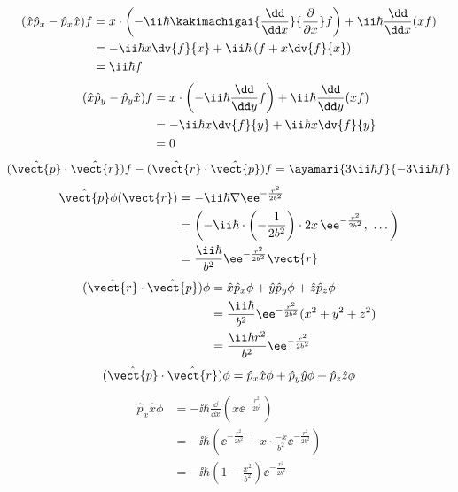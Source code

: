 \begin{align*}
(\hat{x}\hat{p}_{x}-\hat{p}_{x}\hat{x})f&=x\cdot\left(-\ii\hbar\kakimachigai{\frac{\dd}{\dd x}}{\frac{\partial}{\partial x}}f\right)+\ii\hbar\frac{\dd}{\dd x}(xf)\\
&=-\ii\hbar x\dv{f}{x}+\ii\hbar\left(f+x\dv{f}{x}\right)\\
&=\ii\hbar f
\end{align*}
\begin{align*}
(\hat{x}\hat{p}_{y}-\hat{p}_{y}\hat{x})f&=x\cdot\left(-\ii\hbar\frac{\dd}{\dd y}f\right)+\ii\hbar\frac{\dd}{\dd y}(xf)\\
&=-\ii\hbar x\dv{f}{y}+\ii\hbar x\dv{f}{y}\\
&=0
\end{align*}
\[ (\hat{\vect{p}}\cdot\hat{\vect{r}})f-(\hat{\vect{r}}\cdot\hat{\vect{p}})f=\ayamari{3\ii\hbar f}{-3\ii\hbar f} \]
\begin{align*}
\hat{\vect{p}}\phi(\vect{r})&=-\ii\hbar\nabla\ee^{-\frac{r^{2}}{2b^{2}}}\\
&=\left(-\ii\hbar\cdot\left(-\frac{1}{2b^{2}}\right)\cdot2x\,\ee^{-\frac{r^{2}}{2b^{2}}},\ \dots\right)\\
&=\frac{\ii\hbar}{b^{2}}\ee^{-\frac{r^{2}}{2b^{2}}}\vect{r}
\end{align*}
\begin{align*}
(\hat{\vect{r}}\cdot\hat{\vect{p}})\phi&=\hat{x}\hat{p}_{x}\phi+\hat{y}\hat{p}_{y}\phi+\hat{z}\hat{p}_{z}\phi\\
&=\frac{\ii\hbar}{b^{2}}\ee^{-\frac{r^{2}}{2b^{2}}}(x^{2}+y^{2}+z^{2})\\
&=\frac{\ii\hbar r^{2}}{b^{2}}\ee^{-\frac{r^{2}}{2b^{2}}}
\end{align*}
\[ (\hat{\vect{p}}\cdot\hat{\vect{r}})\phi=\hat{p}_{x}\hat{x}\phi+\hat{p}_{y}\hat{y}\phi+\hat{p}_{z}\hat{z}\phi \]
\begin{align*}
\hat{p}_{x}\hat{x}\phi&=-\ii\hbar\frac{\dd}{\dd x}\left(x\ee^{-\frac{r^{2}}{2b^{2}}}\right)\\
&=-\ii\hbar\left(\ee^{-\frac{r^{2}}{2b^{2}}}+x\cdot\frac{-x}{b^{2}}\ee^{-\frac{r^{2}}{2b^{2}}}\right)\\
&=-\ii\hbar\left(1-\frac{x^{2}}{b^{2}}\right)\ee^{-\frac{r^{2}}{2b^{2}}}
\end{align*}
